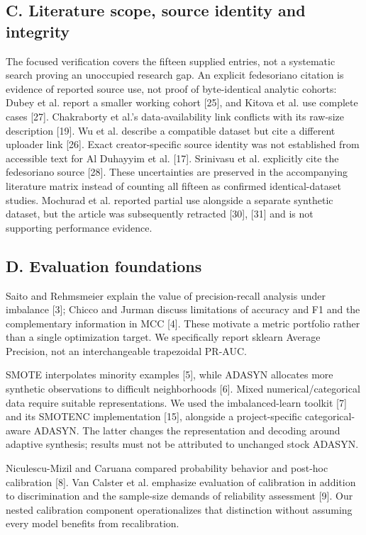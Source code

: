 \documentclass[10pt,twocolumn,letterpaper]{article}
\begin{document}
\subsection*{C. Literature scope, source identity and integrity}
The focused verification covers the fifteen supplied entries, not a systematic search proving an unoccupied research gap. An explicit fedesoriano citation is evidence of reported source use, not proof of byte-identical analytic cohorts: Dubey et al. report a smaller working cohort [25], and Kitova et al. use complete cases [27]. Chakraborty et al.'s data-availability link conflicts with its raw-size description [19]. Wu et al. describe a compatible dataset but cite a different uploader link [26]. Exact creator-specific source identity was not established from accessible text for Al Duhayyim et al. [17]. Srinivasu et al. explicitly cite the fedesoriano source [28]. These uncertainties are preserved in the accompanying literature matrix instead of counting all fifteen as confirmed identical-dataset studies. Mochurad et al. reported partial use alongside a separate synthetic dataset, but the article was subsequently retracted [30], [31] and is not supporting performance evidence.


\subsection*{D. Evaluation foundations}
Saito and Rehmsmeier explain the value of precision-recall analysis under imbalance [3]; Chicco and Jurman discuss limitations of accuracy and F1 and the complementary information in MCC [4]. These motivate a metric portfolio rather than a single optimization target. We specifically report sklearn Average Precision, not an interchangeable trapezoidal PR-AUC.


SMOTE interpolates minority examples [5], while ADASYN allocates more synthetic observations to difficult neighborhoods [6]. Mixed numerical/categorical data require suitable representations. We used the imbalanced-learn toolkit [7] and its SMOTENC implementation [15], alongside a project-specific categorical-aware ADASYN. The latter changes the representation and decoding around adaptive synthesis; results must not be attributed to unchanged stock ADASYN.


Niculescu-Mizil and Caruana compared probability behavior and post-hoc calibration [8]. Van Calster et al. emphasize evaluation of calibration in addition to discrimination and the sample-size demands of reliability assessment [9]. Our nested calibration component operationalizes that distinction without assuming every model benefits from recalibration.
\end{document}
